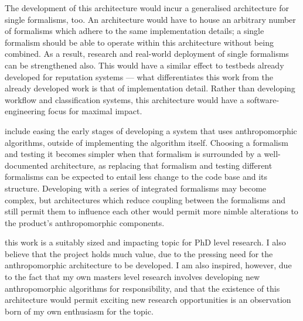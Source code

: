 The development of this architecture would incur a generalised architecture for single formalisms, too. An architecture would have to house an arbitrary number of formalisms which adhere to the same implementation details; a single formalism should be able to operate within this architecture without being combined. As a result, research and real-world deployment of single formalisms can be strengthened also. This would have a similar effect to testbeds already developed for reputation systems\cite{Chandrasekaran2011} --- what differentiates this work from the already developed work is that of implementation detail. Rather than developing workflow and classification systems, this architecture would have a software-engineering focus for maximal impact.\par

 include easing the early stages of developing a system that uses anthropomorphic algorithms, outside of implementing the algorithm itself. Choosing a formalism and testing it becomes simpler when that formalism is surrounded by a well-documented architecture, as replacing that formalism and testing different formalisms can be expected to entail less change to the code base and its structure. Developing with a series of integrated formalisms may become complex, but architectures which reduce coupling between the formalisms and still permit them to influence each other would permit more nimble alterations to the product's anthropomorphic components.\par

\bigskip %

 this work is a suitably sized and impacting topic for PhD level research. I also believe that the project holds much value, due to the pressing need for the anthropomorphic architecture to be developed. I am also inspired, however, due to the fact that my own masters level research involves developing new anthropomorphic algorithms for responsibility, and that the existence of this architecture would permit exciting new research opportunities is an observation born of my own enthusiasm for the topic. \par

